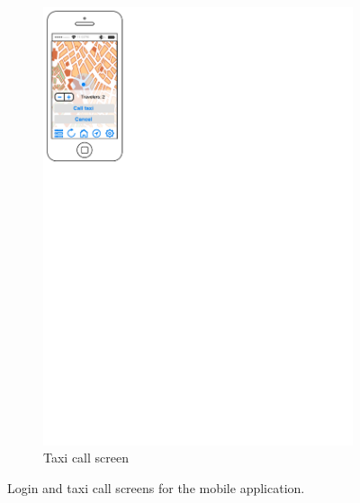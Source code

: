 \begin{figure}
\begin{subfigure}{0.45\textwidth}
        \includegraphics[width=\textwidth]{mockup/app/TaxiCall}
        \caption{Taxi call screen}
        \label{fig:mockup-taxicall-mobile}
    \end{subfigure}
    \caption{Login and taxi call screens for the mobile application.}
\end{figure}

